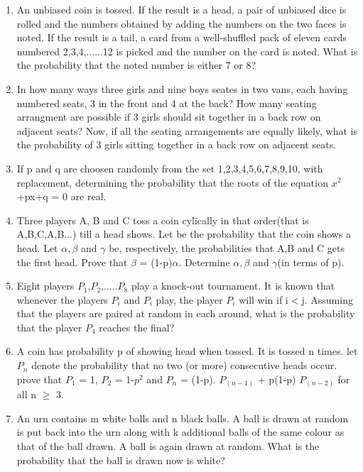 \documentclass[journal,12pt,twocolumn]{IEEEtran}
\begin{document}
\begin{enumerate}[label=\arabic*]
	 \item An unbiased coin is tossed. If the result is a head, a pair of unbiased dice is rolled and the numbers obtained by adding the numbers on the two faces is noted. If the result is a tail, a card from a well-shuffled pack of eleven cards numbered 2,3,4,......12 is picked and the number on the card is noted. What is the probability that the noted number is either 7 or 8?\\
	 \item In how many ways three girls and nine boys seates in two vans, each having numbered seats, 3 in the front and 4 at the back? How many seating arrangment are possible if 3 girls should sit together in a back row on adjacent seats? Now, if all the seating arrangements are equally likely, what is the probability of 3 girls sitting together in a back row on adjacent seats.\\
	 \item If p and q are choosen randomly from the set {1,2,3,4,5,6,7,8,9,10}, with replacement, determining the probability that the roots of the equation $x^{2}$+px+q = 0 are real.\\
	 \item Three players A, B and C toss a coin cylically in that order(that is A,B,C,A,B...) till a head shows. Let be the probability that the coin shows a head. Let $\alpha, \beta$ and $\gamma$ be, respectively, the probabilities that A,B and C gets the first head. Prove that $\beta$ = (1-p)$\alpha$. Determine $\alpha, \beta$ and $\gamma$(in terms of p).\\
	 \item Eight players $P_1$,$P_2$,.....$P_8$ play a knock-out tournament. It is known that whenever the players $P_i$ and $P_i$ play, the player $P_i$ will win if i$<$j. Assuming that the players are paired at random in each around, what is the probability that the player $P_4$ reaches the final?
	\item A coin has probability p of showing head when tossed. It is tossed n times. let $P_n$ denote the probability that no two (or more) consecutive heads occur. prove that  $P_1$ = 1, $P_2$ = 1-$p^{2}$ and  $P_n$ = (1-p).  $P_(n-1)$ + p(1-p) $P_(n-2)$ for all n $\geq$ 3.\\
	\item An urn contains m white balls and n black balls. A ball is drawn at random is put back into the urn along with k additional balls of the same colour as that of the ball drawn. A ball is again drawn at random. What is the probability that the ball is drawn now is white?\\

\end{enumerate}
\end{document}
